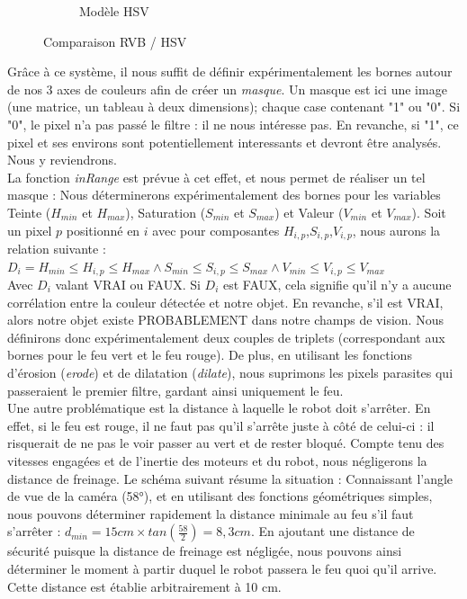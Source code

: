 \begin{itemize}
\begin{figure}[H]
\begin{subfigure}[h]{0.35\textwidth}
					        \caption{Modèle HSV}
					    \end{subfigure}
					    \caption{Comparaison RVB / HSV}
					\end{figure}
					Grâce à ce système, il nous suffit de définir expérimentalement les bornes autour de nos 3 axes de couleurs afin de créer un \textit{masque}. Un masque est ici une image (une matrice, un tableau à deux dimensions); chaque case contenant "1" ou "0". Si "0", le pixel n'a pas passé le filtre : il ne nous intéresse pas. En revanche, si "1", ce pixel et ses environs sont potentiellement interessants et devront être analysés. Nous y reviendrons.\\
					La fonction \textit{inRange} est prévue à cet effet, et nous permet de réaliser un tel masque : 
					Nous déterminerons expérimentalement des bornes pour les variables Teinte ($H_{min}$ et $H_{max}$), Saturation ($S_{min}$ et $S_{max}$) et Valeur ($V_{min}$ et $V_{max}$). Soit un pixel $p$ positionné en $i$ avec pour composantes $H_{i,p}$,$S_{i,p}$,$V_{i,p}$, nous aurons la relation suivante :
					\\ 
					$D_i = H_{min} \leqslant H_{i,p} \leqslant H_{max} 	\land S_{min} \leqslant S_{i,p} \leqslant S_{max} \land V_{min} \leqslant V_{i,p} \leqslant V_{max}$ \cite{bib20}
					\\
					Avec $D_i$ valant VRAI ou FAUX. Si $D_i$ est FAUX, cela signifie qu'il n'y a aucune corrélation entre la couleur détectée et notre objet. En revanche, s'il est VRAI, alors notre objet existe PROBABLEMENT dans notre champs de vision. Nous définirons donc expérimentalement deux couples de triplets (correspondant aux bornes pour le feu vert et le feu rouge). De plus, en utilisant les fonctions d'érosion (\textit{erode}) et de dilatation (\textit{dilate}), nous suprimons les pixels parasites qui passeraient le premier filtre, gardant ainsi uniquement le feu.
					\\

					Une autre problématique est la distance à laquelle le robot doit s'arrêter. En effet, si le feu est rouge, il ne faut pas qu'il s'arrête juste à côté de celui-ci : il risquerait de ne pas le voir passer au vert et de rester bloqué. Compte tenu des vitesses engagées et de l'inertie des moteurs et du robot, nous négligerons la distance de freinage.
					Le schéma suivant résume la situation :
					Connaissant l'angle de vue de la caméra (58°)\cite{bib18}, et en utilisant des fonctions géométriques simples, nous pouvons déterminer rapidement la distance minimale au feu s'il faut s'arrêter : $d_{min} = 15 cm \times tan(\frac{58}{2}) = 8,3 cm$. En ajoutant une distance de sécurité puisque la distance de freinage est négligée, nous pouvons ainsi déterminer le moment à partir duquel le robot passera le feu quoi qu'il arrive. Cette distance est établie arbitrairement à 10 cm.\\


\end{itemize}
